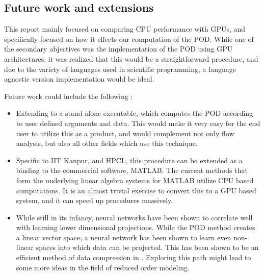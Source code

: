 \documentclass[submit]{aiaa-tc_mod}%
\begin{document}
\subsection{Future work and extensions}
This report mainly focused on comparing CPU performance with GPUs, and specifically focused on how it effects our computation of the POD. While one of the secondary objectives was the implementation of the POD using GPU architectures, it was realized that this would be a straightforward procedure, and due to the variety of languages used in scientific programming, a language agnostic version implementation would be ideal. 

Future work could include the following :

\begin{itemize}
\item
Extending to a stand alone executable, which computes the POD according to user defined arguments and data. This would make it very easy for the end user to utilize this as a product, and would complement not only flow analysis, but also all other fields which use this technique.

\item
Specific to IIT Kanpur, and HPCL, this procedure can be extended as a binding to the commercial software, MATLAB. The current methods that form the underlying linear algebra systems for MATLAB utilize CPU based computations. It is an almost trivial exercise to convert this to a GPU based system, and it can speed up procedures massively. 

\item
While still in its infancy, neural networks have been shown to correlate well with learning lower dimensional projections. While the POD method creates a linear vector space, a neural network has been shown to learn even non-linear spaces into which data can be projected. This has been shown to be an efficient method of data compression in \cite{hinton}. Exploring this path might lead to some more ideas in the field of reduced order modeling. 
\end{itemize}
\end{document}
